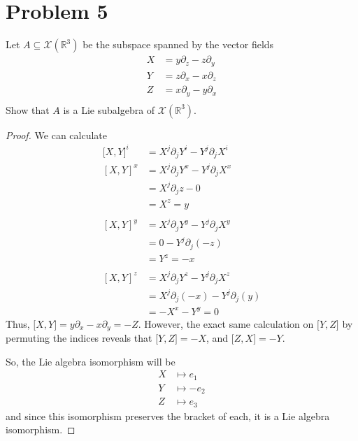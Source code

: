 \documentclass[fontsize=11pt]{scrartcl} %
\numberwithin{equation}{section} %
\numberwithin{figure}{section} %
\numberwithin{table}{section} %
\newcommand{\R}{\mathbb{R}}
\begin{document}
\section*{Problem 5} %
Let $A\subseteq \mathcal{X}(\R^3)$ be the subspace spanned by the vector fields
\[
    \begin{aligned}
        X &= y\partial_z - z\partial_y\\
        Y &= z\partial_x - x\partial_z\\
        Z &= x\partial_y - y\partial_x\\
    \end{aligned}
\]
Show that $A$ is a Lie subalgebra of $\mathcal{X}(\R^3)$.
\\
\begin{proof}
    We can calculate
    \[
        \begin{aligned}
            {[}X,Y{]}^i &= X^j\partial_jY^i - Y^j\partial_jX^i\\
            [X,Y]^x &= X^j\partial_jY^x - Y^j\partial_jX^x\\
                    &= X^j\partial_jz - 0\\
                    &= X^z = y\\
                    \\
            [X,Y]^y &= X^j\partial_jY^y - Y^j\partial_jX^y\\
                    &= 0 - Y^j\partial_j(-z)\\
                    &= Y^z = -x\\
                    \\
            [X,Y]^z &= X^j\partial_jY^z - Y^j\partial_jX^z\\
                    &= X^j\partial_j(-x) - Y^j\partial_j(y)\\
                    &=-X^x - Y^y = 0
        \end{aligned}
    \]
    Thus, ${[}X,Y{]} = y\partial_x - x\partial_y = -Z$. However, the
    exact same calculation on ${[}Y,Z{]}$ by permuting the indices reveals that
    ${[}Y,Z{]} = -X$, and ${[}Z,X{]} = -Y$.

    So, the Lie algebra isomorphism will be
    \[
        \begin{aligned}
            X &\mapsto e_1\\
            Y &\mapsto -e_2\\
            Z &\mapsto e_3
        \end{aligned}
    \]
    and since this isomorphism preserves the bracket of each, it is a Lie
    algebra isomorphism.
\end{proof}
\end{document}
